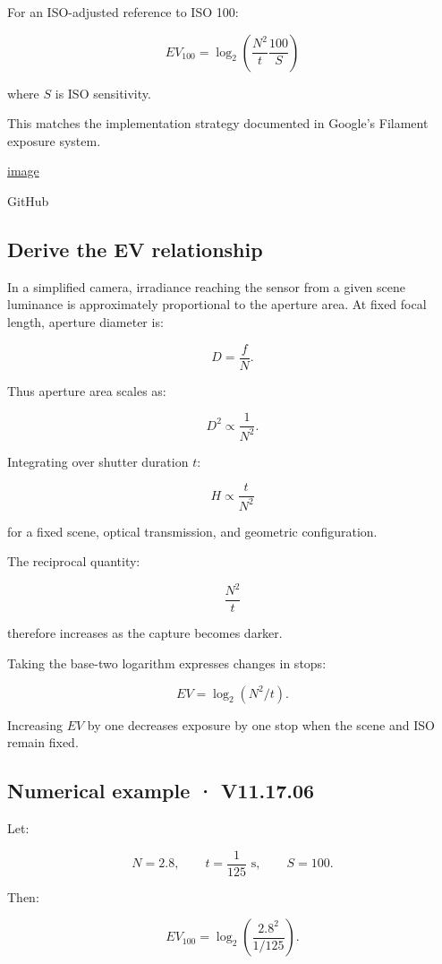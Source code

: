 For an ISO-adjusted reference to ISO 100:

\[ \boxed{ EV_{100} = \log_2\left( \frac{N^2}{t}\frac{100}{S} \right) } \]

where \(S\) is ISO sensitivity.

This matches the implementation strategy documented in Google's Filament exposure system. 

\href{https://www.google.com/s2/favicons?domain=https://github.com&sz=32}{image}

GitHub

\subsection{Derive the EV relationship}\label{02-foundations-ii-ch036-derive-the-ev-relationship}

In a simplified camera, irradiance reaching the sensor from a given scene luminance is approximately proportional to the aperture area. At fixed focal length, aperture diameter is:

\[ D=\frac fN. \]

Thus aperture area scales as:

\[ D^2\propto\frac1{N^2}. \]

Integrating over shutter duration \(t\):

\[ \boxed{ H\propto\frac t{N^2} } \]

for a fixed scene, optical transmission, and geometric configuration.

The reciprocal quantity:

\[ \frac{N^2}{t} \]

therefore increases as the capture becomes darker.

Taking the base-two logarithm expresses changes in stops:

\[ EV=\log_2(N^2/t). \]

Increasing \(EV\) by one decreases exposure by one stop when the scene and ISO remain fixed.

\subsection{Numerical example · V11.17.06}\label{02-foundations-ii-ch036-numerical-example-v11.17.06}

Let:

\[ N=2.8,\qquad t=\frac1{125}\text{ s},\qquad S=100. \]

Then:

\[ EV_{100} = \log_2\left( \frac{2.8^2}{1/125} \right). \]

